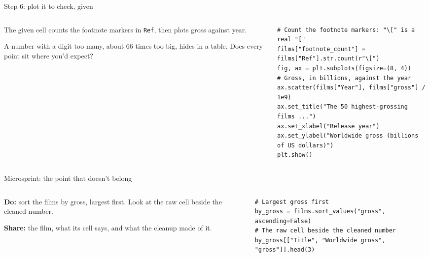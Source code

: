 \documentclass[9pt,aspectratio=169]{beamer}
\begin{document}
\begin{frame}[fragile]{Step 6: plot it to check, given}
    \begin{columns}[T]
        \begin{column}{0.37\textwidth}
            The given cell counts the footnote markers in \texttt{Ref}, then plots gross against year.

            \medskip
            A number with a digit too many, about 66 times too big, hides in a table. Does every point sit where you'd expect?
        \end{column}
        \begin{column}{0.6\textwidth}
\begin{lstlisting}
# Count the footnote markers: "\[" is a real "["
films["footnote_count"] = films["Ref"].str.count(r"\[")
fig, ax = plt.subplots(figsize=(8, 4))
# Gross, in billions, against the year
ax.scatter(films["Year"], films["gross"] / 1e9)
ax.set_title("The 50 highest-grossing films ...")
ax.set_xlabel("Release year")
ax.set_ylabel("Worldwide gross (billions of US dollars)")
plt.show()
\end{lstlisting}
        \end{column}
    \end{columns}
\end{frame}

\begin{frame}[fragile]{Microsprint: the point that doesn't belong}
    \begin{columns}[T]
        \begin{column}{0.37\textwidth}
            \textbf{Do:} sort the films by gross, largest first. Look at the raw cell beside the cleaned number.

            \medskip
            \textbf{Share:} the film, what its cell says, and what the cleanup made of it.
        \end{column}
        \begin{column}{0.6\textwidth}
\begin{lstlisting}
# Largest gross first
by_gross = films.sort_values("gross", ascending=False)
# The raw cell beside the cleaned number
by_gross[["Title", "Worldwide gross", "gross"]].head(3)
\end{lstlisting}
        \end{column}
    \end{columns}
\end{frame}
\end{document}
